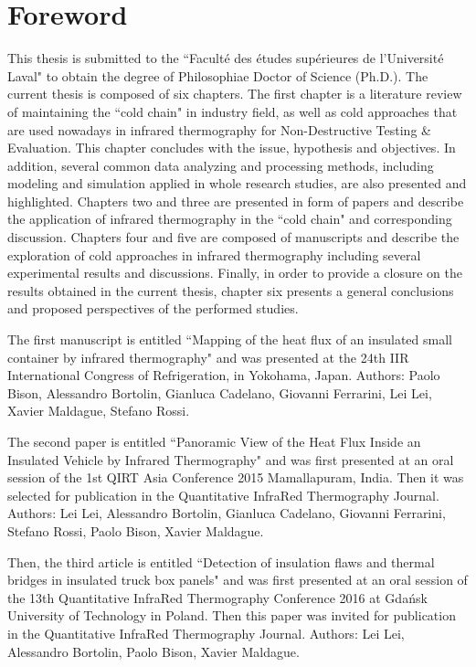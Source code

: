 \chapter*{Foreword}         %

This thesis is submitted to the ``Faculté des études supérieures de l'Université Laval" to obtain the degree of Philosophiae Doctor of Science (Ph.D.). The current thesis is composed of six chapters. The first chapter is a literature review of maintaining the ``cold chain" in industry field, as well as cold approaches that are used nowadays in infrared thermography for Non-Destructive Testing \& Evaluation. This chapter concludes with the issue, hypothesis and objectives. In addition, several common data analyzing and processing methods, including modeling and simulation applied in whole research studies, are also presented and highlighted. Chapters two and three are presented in form of papers and describe the application of infrared thermography in the ``cold chain" and corresponding discussion. Chapters four and five are composed of manuscripts and describe the exploration of cold approaches in infrared thermography including several experimental results and discussions. Finally, in order to provide a closure on the results obtained in the current thesis, chapter six presents a general conclusions and proposed perspectives of the performed studies.

The first manuscript is entitled ``Mapping of the heat flux of an insulated small container by infrared thermography" and was presented at the 24th IIR International Congress of Refrigeration, in Yokohama, Japan. Authors: Paolo Bison, Alessandro Bortolin, Gianluca Cadelano, Giovanni Ferrarini, Lei Lei, Xavier Maldague, Stefano Rossi.

The second paper is entitled ``Panoramic View of the Heat Flux Inside an Insulated Vehicle by Infrared Thermography" and was first presented at an oral session of the 1st QIRT Asia Conference 2015 Mamallapuram, India. Then it was selected for publication in the Quantitative InfraRed Thermography Journal. Authors: Lei Lei, Alessandro Bortolin, Gianluca Cadelano, Giovanni Ferrarini, Stefano Rossi, Paolo Bison, Xavier Maldague. 

Then, the third article is entitled ``Detection of insulation flaws and thermal bridges in insulated truck box panels" and was first presented at an oral session of the 13th Quantitative InfraRed Thermography Conference 2016 at Gdańsk University of Technology in Poland. Then this paper was invited for publication in the Quantitative InfraRed Thermography Journal. Authors: Lei Lei, Alessandro Bortolin, Paolo Bison, Xavier Maldague.

